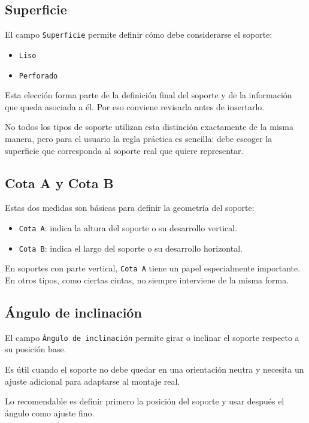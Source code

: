 \subsection{Superficie}

El campo \texttt{Superficie} permite definir cómo debe considerarse el soporte:

\begin{itemize}
\item \texttt{Liso}
\item \texttt{Perforado}
\end{itemize}

Esta elección forma parte de la definición final del soporte y de la información que queda asociada a él. Por eso conviene revisarla antes de insertarlo.

No todos los tipos de soporte utilizan esta distinción exactamente de la misma manera, pero para el usuario la regla práctica es sencilla: debe escoger la superficie que corresponda al soporte real que quiere representar.

\subsection{Cota A y Cota B}

Estas dos medidas son básicas para definir la geometría del soporte:

\begin{itemize}
\item \texttt{Cota A}: indica la altura del soporte o su desarrollo vertical.
\item \texttt{Cota B}: indica el largo del soporte o su desarrollo horizontal.
\end{itemize}

En soportes con parte vertical, \texttt{Cota A} tiene un papel especialmente importante. En otros tipos, como ciertas cintas, no siempre interviene de la misma forma.

\subsection{Ángulo de inclinación}

El campo \texttt{Ángulo de inclinación} permite girar o inclinar el soporte respecto a su posición base.

Es útil cuando el soporte no debe quedar en una orientación neutra y necesita un ajuste adicional para adaptarse al montaje real.

Lo recomendable es definir primero la posición del soporte y usar después el ángulo como ajuste fino.

